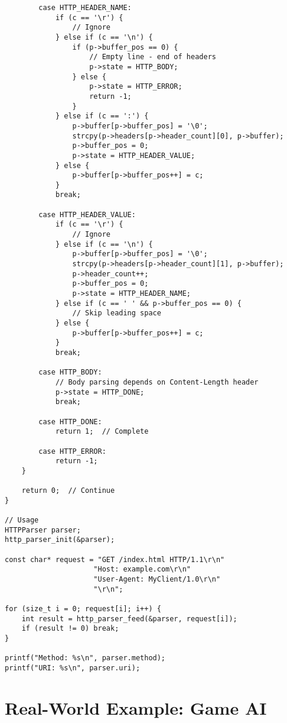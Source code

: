 \begin{lstlisting}
        case HTTP_HEADER_NAME:
            if (c == '\r') {
                // Ignore
            } else if (c == '\n') {
                if (p->buffer_pos == 0) {
                    // Empty line - end of headers
                    p->state = HTTP_BODY;
                } else {
                    p->state = HTTP_ERROR;
                    return -1;
                }
            } else if (c == ':') {
                p->buffer[p->buffer_pos] = '\0';
                strcpy(p->headers[p->header_count][0], p->buffer);
                p->buffer_pos = 0;
                p->state = HTTP_HEADER_VALUE;
            } else {
                p->buffer[p->buffer_pos++] = c;
            }
            break;

        case HTTP_HEADER_VALUE:
            if (c == '\r') {
                // Ignore
            } else if (c == '\n') {
                p->buffer[p->buffer_pos] = '\0';
                strcpy(p->headers[p->header_count][1], p->buffer);
                p->header_count++;
                p->buffer_pos = 0;
                p->state = HTTP_HEADER_NAME;
            } else if (c == ' ' && p->buffer_pos == 0) {
                // Skip leading space
            } else {
                p->buffer[p->buffer_pos++] = c;
            }
            break;

        case HTTP_BODY:
            // Body parsing depends on Content-Length header
            p->state = HTTP_DONE;
            break;

        case HTTP_DONE:
            return 1;  // Complete

        case HTTP_ERROR:
            return -1;
    }

    return 0;  // Continue
}

// Usage
HTTPParser parser;
http_parser_init(&parser);

const char* request = "GET /index.html HTTP/1.1\r\n"
                     "Host: example.com\r\n"
                     "User-Agent: MyClient/1.0\r\n"
                     "\r\n";

for (size_t i = 0; request[i]; i++) {
    int result = http_parser_feed(&parser, request[i]);
    if (result != 0) break;
}

printf("Method: %s\n", parser.method);
printf("URI: %s\n", parser.uri);
\end{lstlisting}

\section{Real-World Example: Game AI}

